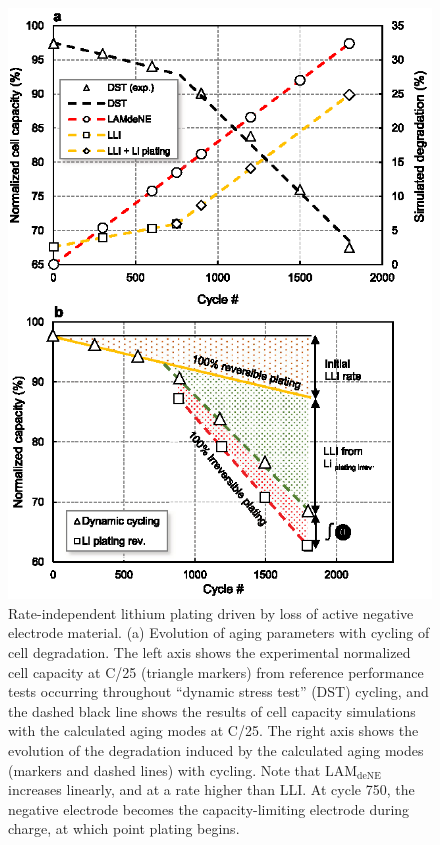 \documentclass[journal=jpclcd,manuscript=article]{achemso}
\begin{document}
\begin{figure}[p]
    \centering
    \includegraphics[scale=1]{figures/thermo_plating_dubarry.eps}
    \caption{Rate-independent lithium plating driven by loss of active negative electrode material. (a) Evolution of aging parameters with cycling of cell degradation. The left axis shows the experimental normalized cell capacity at C/25 (triangle markers) from reference performance tests occurring throughout ``dynamic stress test'' (DST) cycling, and the dashed black line shows the results of cell capacity simulations with the calculated aging modes at C/25. The right axis shows the evolution of the degradation induced by the calculated aging modes (markers and dashed lines) with cycling. Note that $\mathrm{LAM_{deNE}}$ increases linearly, and at a rate higher than LLI. At cycle 750, the negative electrode becomes the capacity-limiting electrode during charge, at which point plating begins.
}
\end{figure}
\end{document}
